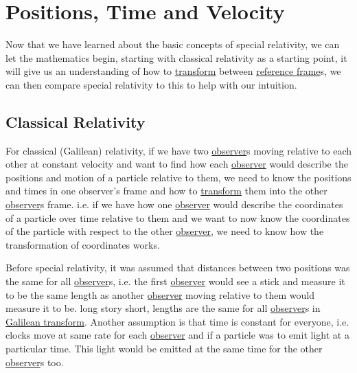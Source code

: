 \chapter{Positions, Time and Velocity} %

Now that we have learned about the basic concepts of special relativity, we can let the mathematics begin, starting with classical relativity as a starting point, it will give us an understanding of how to \hyperlink{def-transform}{transform} between \hyperlink{def-Reference-frame}{reference frame}s, we can then compare special relativity to this to help with our intuition.


\section{Classical Relativity}%

For classical (Galilean) relativity, if we have two \hyperlink{def-observer}{observer}s moving relative to each other at constant velocity and want to find how each \hyperlink{def-observer}{observer} would describe the positions and motion of a particle relative to them, we need to know the positions and times in one observer's frame and how to \hyperlink{def-transform}{transform} them into the other \hyperlink{def-observer}{observer}s frame. i.e. if we have how one \hyperlink{def-observer}{observer} would describe the coordinates of a particle over time relative to them and we want to now know the coordinates of the particle with respect to the other \hyperlink{def-observer}{observer}, we need to know how the transformation of coordinates works.

Before special relativity, it was assumed that distances between two positions was the same for all \hyperlink{def-observer}{observer}s, i.e. the first \hyperlink{def-observer}{observer} would see a stick and measure it to be the same length as another \hyperlink{def-observer}{observer} moving relative to them would measure it to be. long story short, lengths are the same for all \hyperlink{def-observer}{observer}s in \hyperlink{def-galilean-transform}{Galilean transform}. Another assumption is that time is constant for everyone, i.e. clocks move at same rate for each \hyperlink{def-observer}{observer} and if a particle was to emit light at a particular time. This light would be emitted at the same time for the other \hyperlink{def-observer}{observer}s too.

